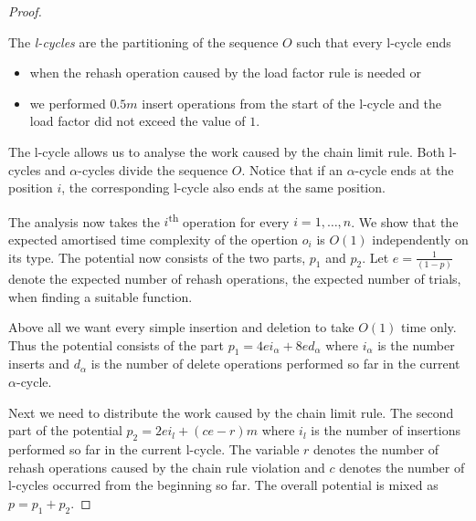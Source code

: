\begin{proof}
\begin{definition}[l-cycle]
The \emph{l-cycles} are the partitioning of the sequence $O$ such that every l-cycle ends
\begin{itemize}
\item when the rehash operation caused by the load factor rule is needed or
\item we performed $0.5 m$ insert operations from the start of the l-cycle and the load factor did not exceed the value of $1$.
\end{itemize}
\end{definition}
The l-cycle allows us to analyse the work caused by the chain limit rule. Both l-cycles and $\alpha$-cycles divide the sequence $O$. Notice that if an $\alpha$-cycle ends at the position $i$, the corresponding l-cycle also ends at the same position. 

The analysis now takes the $i$\textsuperscript{th} operation for every $i = 1, \dots, n$. We show that the expected amortised time complexity of the opertion $o_i$ is $O(1)$ independently on its type. The potential now consists of the two parts, $p_1$ and $p_2$. Let $e = \frac{1}{(1 - p)}$ denote the expected number of rehash operations, the expected number of trials, when finding a suitable function. 

Above all we want every simple insertion and deletion to take $O(1)$ time only. Thus the potential consists of the part $p_1 = 4ei_{\alpha} + 8ed_{\alpha}$ where $i_{\alpha}$ is the number inserts and $d_{\alpha}$ is the number of delete operations performed so far in the current $\alpha$-cycle. 

Next we need to distribute the work caused by the chain limit rule. The second part of the potential $p_2 = 2ei_{l} + (ce - r) m$ where $i_l$ is the number of insertions performed so far in the current l-cycle. The variable $r$ denotes the number of rehash operations caused by the chain rule violation and $c$ denotes the number of l-cycles occurred from the beginning so far. The overall potential is mixed as $p = p_1 + p_2$.


\end{proof}
